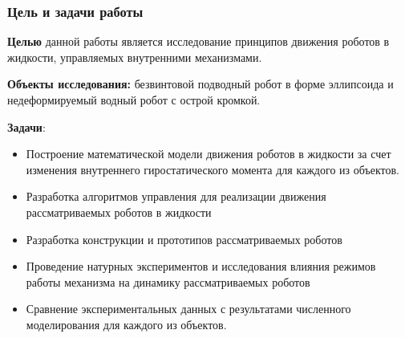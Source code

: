 \begin{frame}
\frametitle{Цель и задачи работы}

\textbf{Целью} данной работы является исследование принципов движения роботов в жидкости, управляемых внутренними механизмами.


\textbf{Объекты исследования:} безвинтовой подводный робот в форме эллипсоида и недеформируемый водный робот с острой кромкой.


\textbf{Задачи}:
\begin{itemize}
	\item Построение математической модели движения роботов в жидкости за счет изменения внутреннего гиростатического момента для каждого из объектов. %
	\item Разработка алгоритмов управления для реализации движения рассматриваемых роботов в жидкости%
	\item Разработка конструкции и прототипов рассматриваемых роботов%
	\item Проведение натурных экспериментов и исследования влияния режимов работы механизма на динамику рассматриваемых роботов%
	\item Сравнение экспериментальных данных с результатами численного моделирования для каждого из объектов. %
\end{itemize}
\end{frame}

